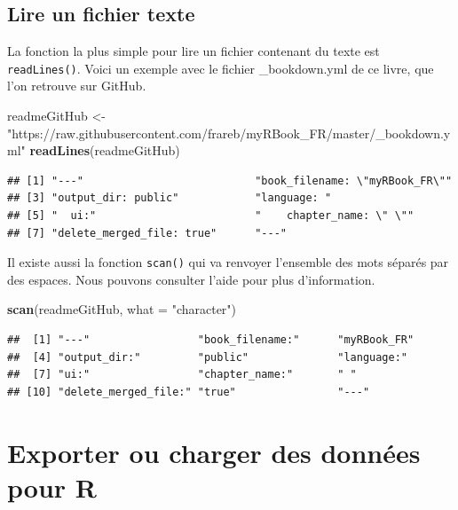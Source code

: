 \documentclass[
]{book}
\newenvironment{Shaded}{\begin{snugshade}}{\end{snugshade}}
\newcommand{\DataTypeTok}[1]{\textcolor[rgb]{0.13,0.29,0.53}{#1}}
\newcommand{\KeywordTok}[1]{\textcolor[rgb]{0.13,0.29,0.53}{\textbf{#1}}}
\newcommand{\NormalTok}[1]{#1}
\newcommand{\StringTok}[1]{\textcolor[rgb]{0.31,0.60,0.02}{#1}}
\begin{document}
\hypertarget{l016readTXT}{%
\subsection{Lire un fichier texte}\label{l016readTXT}}

La fonction la plus simple pour lire un fichier contenant du texte est \texttt{readLines()}. Voici un exemple avec le fichier \_bookdown.yml de ce livre, que l'on retrouve sur GitHub.

\begin{Shaded}
\begin{Highlighting}[]
\NormalTok{readmeGitHub <-}\StringTok{ "https://raw.githubusercontent.com/frareb/myRBook_FR/master/_bookdown.yml"}
\KeywordTok{readLines}\NormalTok{(readmeGitHub)}
\end{Highlighting}
\end{Shaded}

\begin{verbatim}
## [1] "---"                           "book_filename: \"myRBook_FR\""
## [3] "output_dir: public"            "language: "                   
## [5] "  ui:"                         "    chapter_name: \" \""      
## [7] "delete_merged_file: true"      "---"
\end{verbatim}

Il existe aussi la fonction \texttt{scan()} qui va renvoyer l'ensemble des mots séparés par des espaces. Nous pouvons consulter l'aide pour plus d'information.

\begin{Shaded}
\begin{Highlighting}[]
\KeywordTok{scan}\NormalTok{(readmeGitHub, }\DataTypeTok{what =} \StringTok{"character"}\NormalTok{)}
\end{Highlighting}
\end{Shaded}

\begin{verbatim}
##  [1] "---"                 "book_filename:"      "myRBook_FR"         
##  [4] "output_dir:"         "public"              "language:"          
##  [7] "ui:"                 "chapter_name:"       " "                  
## [10] "delete_merged_file:" "true"                "---"
\end{verbatim}

\hypertarget{l016save}{%
\section{Exporter ou charger des données pour R}\label{l016save}}
\end{document}
